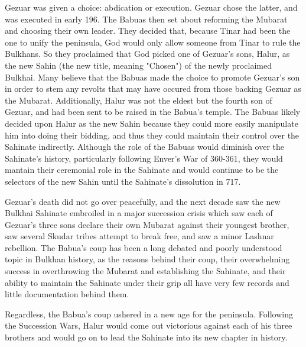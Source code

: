 					Gezuar was given a choice: abdication or execution. Gezuar chose the latter, and was executed in early 196. The Babuas then set about reforming the Mubarat and choosing their own leader. They decided that, because Tinar had been the one to unify the peninsula, God would only allow someone from Tinar to rule the Bulkhans. So they proclaimed that God picked one of Gezuar's sons, Halur, as the new Sahin (the new title, meaning "Chosen") of the newly proclaimed Bulkhai. Many believe that the Babuas made the choice to promote Gezuar's son in order to stem any revolts that may have occured from those backing Gezuar as the Mubarat. Additionally, Halur was not the eldest but the fourth son of Gezuar, and had been sent to be raised in the Babua's temple. The Babuas likely decided upon Halur as the new Sahin because they could more easily manipulate him into doing their bidding, and thus they could maintain their control over the Sahinate indirectly. Although the role of the Babuas would diminish over the Sahinate's history, particularly following Enver's War of 360-361, they would mantain their ceremonial role in the Sahinate and would continue to be the selectors of the new Sahin until the Sahinate's dissolution in 717.
					
					Gezuar's death did not go over peacefully, and the next decade saw the new Bulkhai Sahinate embroiled in a major succession crisis which saw each of Gezuar's three sons declare their own Mubarat against their youngest brother, saw several Skudar tribes attempt to break free, and saw a minor Lashnar rebellion. The Babua's coup has been a long debated and poorly understood topic in Bulkhan history, as the reasons behind their coup, their overwhelming success in overthrowing the Mubarat and establishing the Sahinate, and their ability to maintain the Sahinate under their grip all have very few records and little documentation behind them.
					
					Regardless, the Babua's coup ushered in a new age for the peninsula. Following the Succession Wars, Halur would come out victorious against each of his three brothers and would go on to lead the Sahinate into its new chapter in history.
